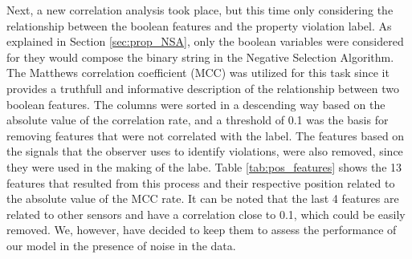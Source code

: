 Next, a new correlation analysis took place, but this time only considering the relationship between the boolean features and the property violation label. As explained in Section \ref{sec:prop_NSA}, only the boolean variables were considered for they would compose the binary string in the Negative Selection Algorithm. The Matthews correlation coefficient (MCC) was utilized for this task \cite{chicco2020advantages} since it provides a truthfull and informative description of the relationship between two boolean features. The columns were sorted in a descending way based on the absolute value of the correlation rate, and a threshold of 0.1 was the basis for removing features that were not correlated with the label. The features based on the signals that the observer uses to identify violations, were also removed, since they were used in the making of the labe. Table \ref{tab:pos_features} shows the 13 features that resulted from this process and their respective position related to the absolute value of the MCC rate. It can be noted that the last 4 features are related to other sensors and have a correlation close to 0.1, which could be easily removed. We, however, have decided to keep them to assess the performance of our model in the presence of noise in the data.


